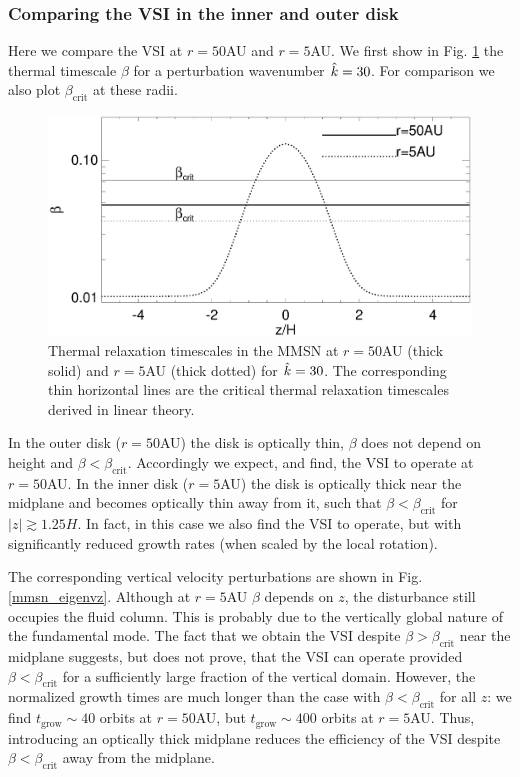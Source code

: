 \subsubsection{Comparing the VSI in the inner and outer disk} 
Here we compare the VSI at $r=50$AU and $r=5$AU. We first show in
Fig. \ref{beta_compare}  the thermal timescale $\beta$ for a
perturbation wavenumber $\hat{k}=30$. For comparison we also plot
$\beta_\mathrm{crit}$ at these radii.   

 \begin{figure}
  \includegraphics[width=\linewidth,clip=true,trim=0cm 0cm 0cm
  0cm]{figures/beta_compare}
  \caption{Thermal relaxation timescales in the MMSN at $r=50$AU
    (thick solid) and $r=5$AU (thick dotted) for $\hat{k}=30$. The
    corresponding thin horizontal lines are the critical thermal
    relaxation timescales derived in linear theory. 
    \label{beta_compare}}
\end{figure}

In the outer disk ($r=50$AU) the disk is optically thin, $\beta$ 
does not depend on height and $\beta <
\beta_\mathrm{crit}$. Accordingly we expect, and find, the VSI to
operate at $r=50$AU. In the inner disk ($r=5$AU) the disk is optically
thick near the midplane and becomes optically thin away from it, such
that $\beta < \beta_\mathrm{crit}$ for $|z|\gtrsim1.25H$. In
fact, in this case  we also find the VSI to operate, but with 
significantly reduced growth rates (when scaled by the local
rotation).  

The corresponding vertical velocity perturbations are shown in 
Fig. \ref{mmsn_eigenvz}. Although at $r=5$AU $\beta$ depends on $z$,
the disturbance still occupies the fluid column. This is probably due
to the vertically global nature of the fundamental mode. The fact that
we obtain the VSI despite $\beta > \beta_\mathrm{crit}$ near the
midplane suggests, but does not prove, that the VSI can operate
provided $\beta < \beta_\mathrm{crit}$ for a sufficiently large
fraction of the vertical domain. However, the normalized growth times
are much longer than the case with $\beta < \beta_\mathrm{crit}$ for
all $z$: we find $t_\mathrm{grow}\sim 40$ orbits at $r=50$AU,
but $t_\mathrm{grow}\sim 400$ orbits at $r=5$AU. Thus, introducing an
optically thick midplane reduces the efficiency of the VSI despite
$\beta < \beta_\mathrm{crit}$ away from the midplane. 

